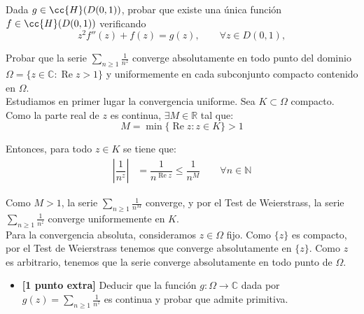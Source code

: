 \documentclass[12pt]{article}
\renewcommand{\Re}{\operatorname{Re}} %
\begin{document}
    \begin{ejercicio}[3.5 puntos]
        Dada $g\in \cc{H}(D(0,1))$, probar que existe una única función $f\in \cc{H}(D(0,1))$ verificando
        \begin{equation*}
            z^2f''(z)+ f(z) = g(z),\qquad \forall z\in D(0,1),
        \end{equation*}
    \end{ejercicio}



    \newpage
    \setcounter{ejercicio}{0}



    \begin{ejercicio}[3.5 puntos]
        Probar que la serie $\sum\limits_{n \geq 1} \frac{1}{n^z}$ converge absolutamente en todo punto del dominio $\Omega = \{z \in \mathbb{C} : \Re z > 1\}$ y uniformemente en cada subconjunto compacto contenido en $\Omega$.\\


        Estudiamos en primer lugar la convergencia uniforme. Sea $K\subset \Omega$ compacto. Como la parte real de $z$ es continua, $\exists M\in \mathbb{R}$ tal que:
        \begin{equation*}
            M=\min\{\Re z : z\in K\} > 1
        \end{equation*}
        
        Entonces, para todo $z\in K$ se tiene que:
        \begin{align*}
            \left|\dfrac{1}{n^z}\right| &= \dfrac{1}{n^{\Re z}} \leq \dfrac{1}{n^M} \qquad \forall n\in \mathbb{N}
        \end{align*}

        Como $M> 1$, la serie $\displaystyle \sum_{n\geq 1} \frac{1}{n^M}$ converge, y por el Test de Weierstrass, la serie $\displaystyle \sum_{n\geq 1} \frac{1}{n^z}$ converge uniformemente en $K$.\\

        Para la convergencia absoluta, consideramos $z\in \Omega$ fijo. Como $\{z\}$ es compacto, por el Test de Weierstrass tenemos que converge absolutamente en $\{z\}$. Como $z$ es arbitrario, tenemos que la serie converge absolutamente en todo punto de $\Omega$.
    
        \begin{itemize}
            \item \textbf{[1 punto extra]} Deducir que la función $g : \Omega \to \mathbb{C}$ dada por $g(z)=\sum\limits_{n \geq 1} \frac{1}{n^z}$ es continua y probar que admite primitiva.
            

\end{itemize}
\end{ejercicio}
\end{document}
